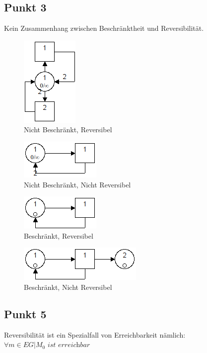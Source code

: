 \documentclass[10pt]{scrartcl}
\begin{document}
		\subsection{Punkt 3}
		Kein Zusammenhang zwischen Beschränktheit und Reversibilität.
				\begin{figure}[H]
    				\centering	
					\includegraphics[scale=0.5]{aufg031.png}		
            		\caption{Nicht Beschränkt, Reversibel}
				\end{figure}
				\begin{figure}[H]
    				\centering	
					\includegraphics[scale=0.5]{aufg032.png}		
            		\caption{Nicht Beschränkt, Nicht Reversibel}
				\end{figure}
				\begin{figure}[H]
    				\centering	
					\includegraphics[scale=0.5]{aufg033.png}		
            		\caption{Beschränkt, Reversibel}
				\end{figure}
				\begin{figure}[H]
    				\centering	
					\includegraphics[scale=0.5]{aufg034.png}		
            		\caption{Beschränkt, Nicht Reversibel}
				\end{figure}
		
		
		\subsection{Punkt 5} 
		Reversibilität ist ein Spezialfall von Erreichbarkeit nämlich: $\forall m \in EG | M_0 \textit{ ist erreichbar}$
		
\end{document}
